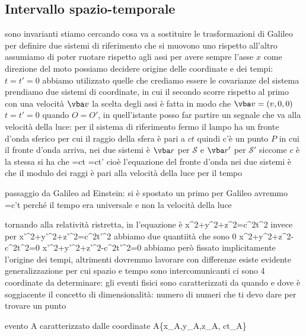 \subsection{Intervallo spazio-temporale}
sono invarianti
stiamo cercando cosa va a sostituire le trasformazioni di Galileo
per definire due sistemi di riferimento che si muovono uno rispetto all'altro 
assumiamo di poter ruotare rispetto agli assi per avere sempre l'asse $x$ come direzione del moto
possiamo decidere origine delle coordinate e dei tempi: $t=t'=0$
abbiamo utilizzato quelle che crediamo essere le covarianze del sistema
prendiamo due sistemi di coordinate, in cui il secondo scorre rispetto al primo con una velocità $\vba v$ la scelta degli assi è fatta in modo che $\vba v=(v,0,0)$
$t=t'=0$ quando $O=O'$, in quell'istante posso far partire un segnale che va alla velocità della luce: per il sistema di riferimento fermo il lampo ha un fronte d'onda sferico per cui il raggio della sfera è pari a $ct$
quindi c'è un punto $P$ in cui il fronte d'onda arriva, nei due sistemi è $\vba r$ per $\mathcal{S}$ e $\vba r'$ per $\mathcal{S'}$
siccome $c$ è la stessa si ha che
	=ct
	=ct'
cioè l'equazione del fronte d'onda nei due sistemi è che il modulo dei raggi è pari alla velocità della luce per il tempo

passaggio da Galileo ad Einstein: si è spostato un primo
per Galileo avremmo 
	=c't
perché il tempo era universale e non la velocità della luce

tornando alla relatività ristretta, in  l'equazione è
	x^2+y^2+z^2=c^2t^2
invece per 	
	x'^2+y'^2+z'^2=c^2t'^2
abbiamo due quantiità che sono 0
	x^2+y^2+z^2-c^2t^2=0
	x'^2+y'^2+z'^2-c^2t'^2=0
abbiamo però fissato implicitamente l'origine dei tempi, altrimenti dovremmo lavorare con differenze
esiste evidente generalizzazione per cui spazio e tempo sono intercomunicanti ci sono 4 coordinate da determinare: gli eventi fisici sono caratterizzati da quando e dove
è soggiacente il concetto di dimensionalità: numero di numeri che ti devo dare per trovare un punto

evento A caratterizzato dalle coordinate
	A\equiv \{x_A,y_A,z_A, ct_A\}
	
